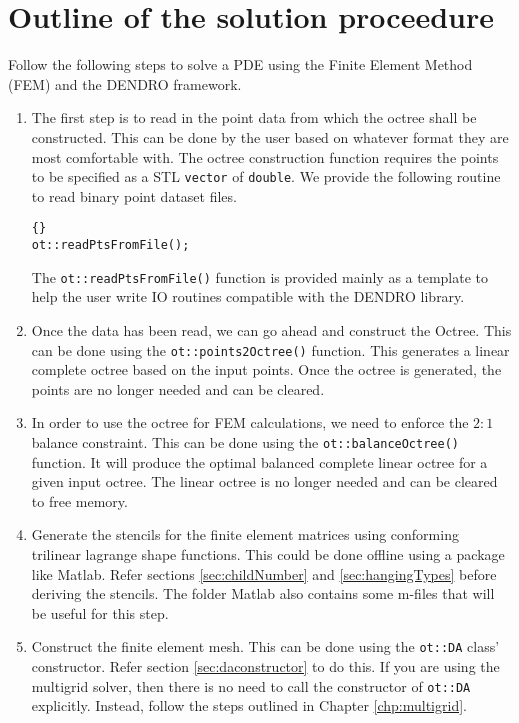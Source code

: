 \documentclass[10pt,reqno,a4paper]{report}
\numberwithin{equation}{section}
\begin{document}
\section{Outline of the solution proceedure}
\label{sec:femOutline}
Follow the following steps to solve a PDE using the Finite Element Method (FEM) and the DENDRO framework. 
\begin{enumerate}
\item The first step is to read in the point data from which the octree shall be constructed. This can be done by the user based on whatever format they are most comfortable with. The octree construction function requires the points to be specified as a STL {\tt vector} of {\tt double}. We provide the following routine to read binary point dataset files. 

\begin{lstlisting}[frame=trbl, fontadjust]{}
ot::readPtsFromFile();
\end{lstlisting}

The \lstinline[basicstyle=\bfseries]!ot::readPtsFromFile()! function is provided mainly as a template to help the user write IO routines compatible with the DENDRO library.

\item Once the data has been read, we can go ahead and construct the Octree. This can be done using
 the \lstinline[basicstyle=\bfseries]!ot::points2Octree()! function. This generates a linear complete octree based on the input points. Once the octree is generated, the points are no longer needed and can be cleared.

\item In order to use the octree for FEM calculations, we need to enforce the $2:1$ balance constraint. This can be done using the \lstinline[basicstyle=\bfseries]!ot::balanceOctree()! function. It will produce the optimal balanced complete linear octree for a given input octree. The linear octree is no longer needed and can be cleared to free memory.

\item Generate the stencils for the finite element matrices using conforming trilinear lagrange shape functions. This could be done offline using a package like Matlab. Refer sections \ref{sec:childNumber} and \ref{sec:hangingTypes} before deriving the stencils. The folder Matlab also contains some m-files that will be useful for this step.

\item Construct the finite element mesh. This can be done using the {\tt ot::DA} class' constructor. Refer section \ref{sec:daconstructor} to do this. If you are using the multigrid solver, then there is no need to call the constructor of {\tt ot::DA} explicitly. Instead, follow the steps outlined in Chapter \ref{chp:multigrid}. 


\end{enumerate}
\end{document}
